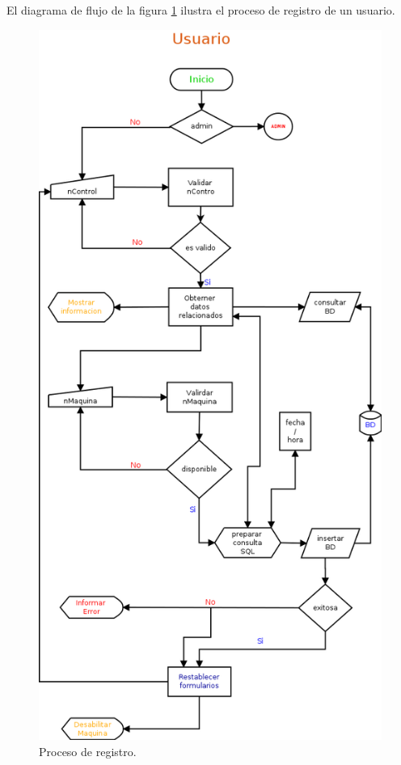 \documentclass[12pt]{article} %
\begin{document}
			El diagrama de flujo de la figura \ref{user_flow} ilustra el proceso de registro de un usuario.
			\begin{figure}[h!]%
				\centering
				\includegraphics[scale=0.4]{./imagenes/flujo_usuario}
				\caption{Proceso de registro.}\label{user_flow}
			\end{figure}			
		
\end{document}
